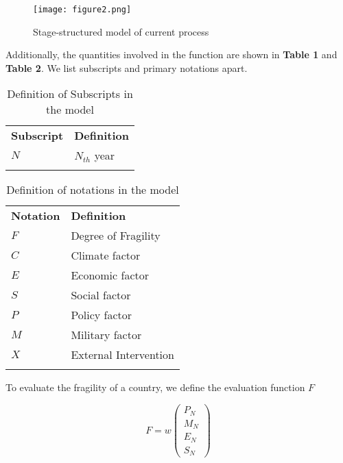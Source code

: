 \documentclass{mcmthesis}
\newlength\savedwidth
\newcommand\whline{\noalign{\global\savedwidth\arrayrulewidth
                            \global\arrayrulewidth 1.2pt}%
                   \hline
                   \noalign{\global\arrayrulewidth\savedwidth}}
\newlength\savewidth
\newcommand\shline{\noalign{\global\savewidth\arrayrulewidth
                            \global\arrayrulewidth 1.2pt}%
                   \hline
                   \noalign{\global\arrayrulewidth\savewidth}}
\begin{document}
\begin{figure}[h]
	\small
	\centering
	\texttt{[image: figure2.png]}
	\caption{Stage-structured model of current process} \label{fig:Stage-structured model of current process}
\end{figure}

\noindent Additionally, the quantities involved in the function are shown in \textbf{Table 1} and \textbf{Table 2}. We list subscripts and primary notations apart.\\

\begin{table}[htbp]
	\renewcommand\arraystretch{1.5}
	\footnotesize
	\centering
	\begin{tabular}{m{3cm}<{\centering}|m{10cm}<{\centering}}
		\whline
		\textbf{Subscript}&\textbf{Definition}\\
		\whline 
		$N$&$N_{th}$ year\\ 
		\shline
	\end{tabular}
	\caption{Definition of Subscripts in the model}\label{tab:Definition of Subscripts in the model}
\end{table}
\begin{table}[htbp]
	\renewcommand\arraystretch{1.5}
	\footnotesize
	\centering
	\begin{tabular}{m{3cm}<{\centering}|m{10cm}<{\centering}}
		\whline
		\textbf{Notation}&\textbf{Definition}\\
		\whline 
		$F$&Degree of Fragility\\
		$C$&Climate factor\\
		$E$&Economic factor\\
		$S$&Social factor\\
		$P$&Policy factor\\ 
		$M$&Military factor\\
		$X$&External Intervention\\
		\shline
	\end{tabular}
	\caption{Definition of notations in the model}\label{tab:Definition of notations in the model}
\end{table}

To evaluate the fragility of a country, we define the evaluation function $F$

\begin{equation}
	F = w 
	\left(
	\begin{matrix}
		P_N \\ M_N \\ E_N \\ S_N
	\end{matrix}
	\right)
\end{equation}
\end{document}

